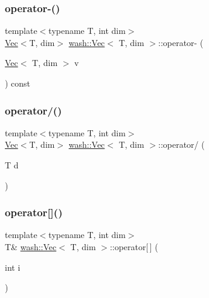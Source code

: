 \mbox{\label{classwash_1_1Vec_a83a86542f9afb7ea0b5b7b8ab72eb119}} 
\subsubsection{\texorpdfstring{operator-\/()}{operator-()}}
{\footnotesize\ttfamily template$<$typename T, int dim$>$ \\
\mbox{\hyperlink{classwash_1_1Vec}{Vec}}$<$T, dim$>$ \mbox{\hyperlink{classwash_1_1Vec}{wash\+::\+Vec}}$<$ T, dim $>$\+::operator-\/ (\begin{DoxyParamCaption}\item[{\mbox{\hyperlink{classwash_1_1Vec}{Vec}}$<$ T, dim $>$}]{v }\end{DoxyParamCaption}) const\hspace{0.3cm}{\ttfamily [inline]}}

\mbox{\label{classwash_1_1Vec_a972cde51776de1a9efec7ed6ea02f401}} 
\subsubsection{\texorpdfstring{operator/()}{operator/()}}
{\footnotesize\ttfamily template$<$typename T, int dim$>$ \\
\mbox{\hyperlink{classwash_1_1Vec}{Vec}}$<$T, dim$>$ \mbox{\hyperlink{classwash_1_1Vec}{wash\+::\+Vec}}$<$ T, dim $>$\+::operator/ (\begin{DoxyParamCaption}\item[{T}]{d }\end{DoxyParamCaption})\hspace{0.3cm}{\ttfamily [inline]}}

\mbox{\label{classwash_1_1Vec_ac9bf604894ed27189131909371e5af70}} 
\subsubsection{\texorpdfstring{operator[]()}{operator[]()}\hspace{0.1cm}{\footnotesize\ttfamily [1/2]}}
{\footnotesize\ttfamily template$<$typename T, int dim$>$ \\
T\& \mbox{\hyperlink{classwash_1_1Vec}{wash\+::\+Vec}}$<$ T, dim $>$\+::operator\mbox{[}$\,$\mbox{]} (\begin{DoxyParamCaption}\item[{int}]{i }\end{DoxyParamCaption})\hspace{0.3cm}{\ttfamily [inline]}}

